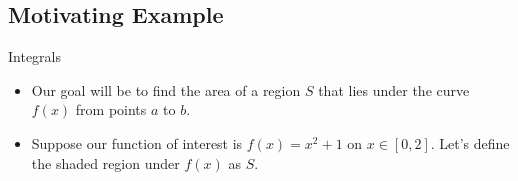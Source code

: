 \documentclass[]{beamer}
\begin{document}
\subsection{Motivating Example}
    \begin{frame}{Integrals}
    \begin{itemize}
        \item Our goal will be to find the area of a region $S$ that lies under the curve $f(x)$ from points $a$ to $b$.
        \item<2-> Suppose our function of interest is $f(x) = x^2 + 1$ on $x\in[0,2]$. Let's define the shaded region under $f(x)$ as $S$. \\
        \begin{center}
        \end{center}
    \end{itemize}
    \end{frame}
\end{document}
